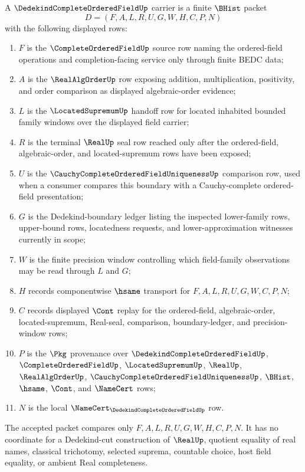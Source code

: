 \begin{definition}
\label{def:dedekind-complete-ordered-field-carrier}
A $\DedekindCompleteOrderedFieldUp$ carrier is a finite $\BHist$ packet
$$
D=(F,A,L,R,U,G,W,H,C,P,N)
$$
with the following displayed rows:
\begin{enumerate}
\item $F$ is the $\CompleteOrderedFieldUp$ source row naming the ordered-field operations and completion-facing service only through finite BEDC data;
\item $A$ is the $\RealAlgOrderUp$ row exposing addition, multiplication, positivity, and order comparison as displayed algebraic-order evidence;
\item $L$ is the $\LocatedSupremumUp$ handoff row for located inhabited bounded family windows over the displayed field carrier;
\item $R$ is the terminal $\RealUp$ seal row reached only after the ordered-field, algebraic-order, and located-supremum rows have been exposed;
\item $U$ is the $\CauchyCompleteOrderedFieldUniquenessUp$ comparison row, used when a consumer compares this boundary with a Cauchy-complete ordered-field presentation;
\item $G$ is the Dedekind-boundary ledger listing the inspected lower-family rows, upper-bound rows, locatedness requests, and lower-approximation witnesses currently in scope;
\item $W$ is the finite precision window controlling which field-family observations may be read through $L$ and $G$;
\item $H$ records componentwise $\hsame$ transport for $F,A,L,R,U,G,W,C,P,N$;
\item $C$ records displayed $\Cont$ replay for the ordered-field, algebraic-order, located-supremum, Real-seal, comparison, boundary-ledger, and precision-window rows;
\item $P$ is the $\Pkg$ provenance over $\DedekindCompleteOrderedFieldUp$, $\CompleteOrderedFieldUp$, $\LocatedSupremumUp$, $\RealUp$, $\RealAlgOrderUp$, $\CauchyCompleteOrderedFieldUniquenessUp$, $\BHist$, $\hsame$, $\Cont$, and $\NameCert$ rows;
\item $N$ is the local $\NameCert_{\DedekindCompleteOrderedFieldUp}$ row.
\end{enumerate}
The accepted packet compares only $F,A,L,R,U,G,W,H,C,P,N$. It has no coordinate for a Dedekind-cut construction of $\RealUp$, quotient equality of real names, classical trichotomy, selected suprema, countable choice, host field equality, or ambient Real completeness.
\end{definition}

